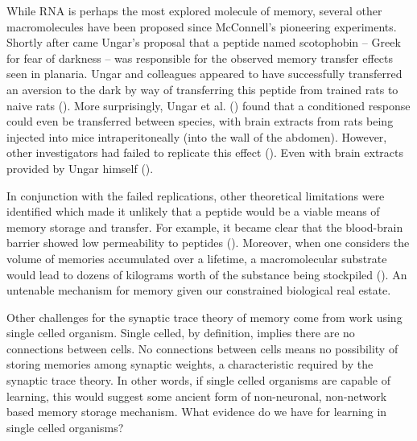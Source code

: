 \documentclass[
  jou,
  floatsintext,
  longtable,
  nolmodern,
  notxfonts,
  notimes,
  donotrepeattitle,
  colorlinks=true,linkcolor=blue,citecolor=blue,urlcolor=blue]{apa7}
\begin{document}
While RNA is perhaps the most explored molecule of memory, several other
macromolecules have been proposed since McConnell's pioneering
experiments. Shortly after came Ungar's proposal that a peptide named
scotophobin -- Greek for fear of darkness -- was responsible for the
observed memory transfer effects seen in planaria. Ungar and colleagues
appeared to have successfully transferred an aversion to the dark by way
of transferring this peptide from trained rats to naive rats
(). More
surprisingly, Ungar et al. ()
found that a conditioned response could even be transferred between
species, with brain extracts from rats being injected into mice
intraperitoneally (into the wall of the abdomen). However, other
investigators had failed to replicate this effect
().
Even with brain extracts provided by Ungar himself
().

In conjunction with the failed replications, other theoretical
limitations were identified which made it unlikely that a peptide would
be a viable means of memory storage and transfer. For example, it became
clear that the blood-brain barrier showed low permeability to peptides
().
Moreover, when one considers the volume of memories accumulated over a
lifetime, a macromolecular substrate would lead to dozens of kilograms
worth of the substance being stockpiled
(). An untenable
mechanism for memory given our constrained biological real estate.

Other challenges for the synaptic trace theory of memory come from work
using single celled organism. Single celled, by definition, implies
there are no connections between cells. No connections between cells
means no possibility of storing memories among synaptic weights, a
characteristic required by the synaptic trace theory. In other words, if
single celled organisms are capable of learning, this would suggest some
ancient form of non-neuronal, non-network based memory storage
mechanism. What evidence do we have for learning in single celled
organisms?
\end{document}
